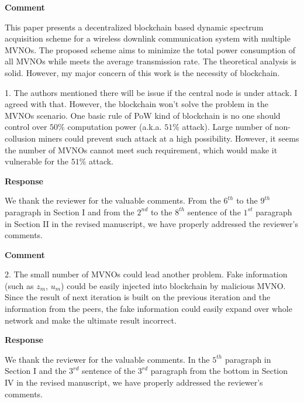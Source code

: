 \documentclass[12pt,draftcls, onecolumn]{IEEEtran}
\begin{document}
\vspace{3mm}
\noindent\textcolor[rgb]{1.00,0.00,0.00}{\textbf{Comment}}
\vspace{3mm}

This paper presents a decentralized blockchain based dynamic spectrum acquisition scheme for a wireless downlink communication system with multiple MVNOs. The proposed scheme aims to minimize the total power consumption of all MVNOs while meets the average transmission rate. The theoretical analysis is solid. However, my major concern of this work is the necessity of blockchain. 

1. The authors mentioned there will be issue if the central node is under attack. I agreed with that. However, the blockchain won't solve the problem in the MVNOs scenario. One basic rule of PoW kind of blockchain is no one should control over $ 50\% $ computation power (a.k.a. $ 51\% $ attack). Large number of non-collusion miners could prevent such attack at a high possibility. However, it seems the number of MVNOs cannot meet such requirement, which would make it vulnerable for the $ 51\% $ attack.

\vspace{3mm} \noindent\textcolor[rgb]{0.00,0.00,1.00}{\textbf{Response}}
\vspace{2mm}

We thank the reviewer for the valuable comments. From the $ 6^{th} $ to the $ 9^{th} $ paragraph in Section I and from the $ 2^{nd} $ to the $ 8^{th} $ sentence of the $ 1^{st} $ paragraph in Section II in the revised manuscript, we have properly addressed the reviewer's comments.

\vspace{3mm}
\noindent\textcolor[rgb]{1.00,0.00,0.00}{\textbf{Comment}}
\vspace{3mm}

2. The small number of MVNOs could lead another problem. Fake information (such as $z_m$, $u_m$) could be easily injected into blockchain by malicious MVNO. Since the result of next iteration is built on the previous iteration and the information from the peers, the fake information could easily expand over whole network and make the ultimate result incorrect.


\vspace{3mm} \noindent\textcolor[rgb]{0.00,0.00,1.00}{\textbf{Response}}
\vspace{2mm}

We thank the reviewer for the valuable comments. In the $ 5^{th} $ paragraph in Section I and the $ 3^{rd} $ sentence of the  $ 3^{rd} $ paragraph from the bottom in Section IV in the revised manuscript, we have properly addressed the reviewer's comments.
\end{document}
